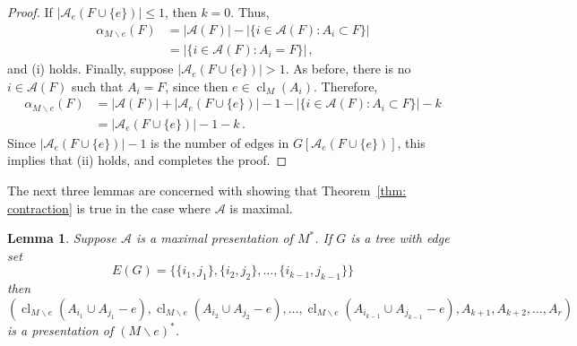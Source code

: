 \documentclass[11pt, reqno]{amsart}
\newtheorem{lemma}[theorem]{Lemma}
\DeclareMathOperator{\cl}{cl}
\begin{document}
\begin{proof}
If $|\mathcal A_e(F \cup \{e\})| \leq 1$, then $k = 0$. Thus,
\begin{align*}
\alpha_{M \backslash e}(F) &= |\mathcal A(F)| - |\{i \in \mathcal A(F) : A_i \subset F\}| \\
&= |\{i \in \mathcal A(F) : A_i = F\}| \,,
\end{align*}
and (i) holds. Finally, suppose $|\mathcal A_e(F \cup \{e\})| > 1$. As before, there is no $i \in \mathcal A(F)$ such that $A_i = F$, since then $e \in \cl_M(A_i)$. Therefore,
\begin{align*}
\alpha_{M \backslash e}(F) &= |\mathcal A(F)| + |\mathcal A_e(F \cup \{e\})| - 1 - |\{i \in \mathcal A(F) : A_i \subset F\}| - k \\
&= |\mathcal A_e(F \cup \{e\})| - 1 - k \,.
\end{align*}
Since $|\mathcal A_e(F \cup \{e\})| - 1$ is the number of edges in $G[\mathcal A_e(F \cup \{e\})]$, this implies that (ii) holds, and completes the proof.
\end{proof}

The next three lemmas are concerned with showing that Theorem~\ref{thm: contraction} is true in the case where $\mathcal A$ is maximal.

\begin{lemma} \label{lem: tree sufficient}
Suppose $\mathcal A$ is a maximal presentation of $M^*$. If $G$ is a tree with edge set
$$
E(G) = \{\{i_1,j_1\},\{i_2,j_2\},\ldots,\{i_{k-1},j_{k-1}\}\}
$$
then
$$
(\cl_{M\backslash e}(A_{i_1} \cup A_{j_1} - e), \cl_{M\backslash e}(A_{i_2} \cup A_{j_2} - e), \ldots, \cl_{M \backslash e}(A_{i_{k-1}} \cup A_{j_{k-1}} - e), A_{k+1}, A_{k+2},\ldots,A_r)
$$
is a presentation of $(M \backslash e)^*$.
\end{lemma}
\end{document}
